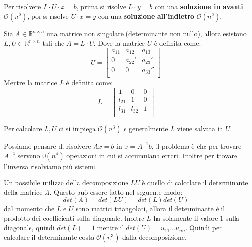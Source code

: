 Per risolvere $L\cdot U \cdot x =b$, prima si risolve $L\cdot y =b$ con una
\textbf{soluzione in avanti} $\mathcal{O}(n^2)$, poi si risolve $U \cdot x = y$
con una \textbf{soluzione all'indietro} $\mathcal{O}(n^2)$.
\begin{teorema}
    Sia $A \in \mathbb{R}^{n\times n}$ una matrice non singolare (determinante
    non nullo), allora esistono $L,U \in \mathbb{R}^{n\times n}$ tali che $A =
        L \cdot U$.
    Dove la matrice $U$ è definita come:
    \begin{equation*}
        U=\left[\begin{array}{ccc}
                a_{11} & a_{12}  & a_{13}   \\
                0      & a_{22}' & a_{23}'  \\
                0      & 0       & a_{33}'' \\
            \end{array}\right]
    \end{equation*}
    Mentre la matrice $L$ è definita come:
    \begin{equation*}
        L=\left[\begin{array}{ccc}
                1      & 0      & 0 \\
                l_{21} & 1      & 0 \\
                l_{31} & l_{32} & 1 \\
            \end{array}\right]
    \end{equation*}
\end{teorema}
Per calcolare $L,U$ ci si impiega $\mathcal{O}(n^3)$ e generalmente $L$ viene
salvata in $U$.
\begin{nota}
    Possiamo pensare di risolvere $Ax=b$ in $x= A^{-1}b$, il problema è che per
    trovare $A^{-1}$ servono $\mathcal{0}(n^4)$ operazioni in cui si accumulano
    errori. Inoltre per trovare l'inversa risolviamo più sistemi.
\end{nota}
\begin{nota}
    Un possibile utilizzo della decomposizione $LU$ è quello di calcolare il
    determinante della matrice $A$. Questo può essere fatto nel seguente modo:
    \begin{equation}
        det(A) = det(LU) = det(L)det(U)
    \end{equation}
    dal momento che $L$ e $U$ sono matrici triangolari, allora il determinante è
    il prodotto dei coefficienti sulla diagonale. Inoltre $L$ ha solamente il
    valore $1$ sulla diagonale, quindi $det(L) = 1$ mentre il $det(U) = u_{11}
        \dots u_{nn}$. Quindi per calcolare il determinante costa $\mathcal{O}(n^3)$
    dalla decomposizione.
\end{nota}
